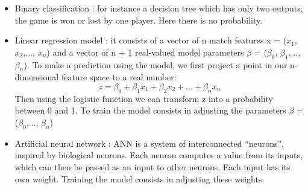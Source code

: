 \documentclass[12pt]{article}
\begin{document}
\begin{itemize}
    \item Binary classification : for instance a decision tree which has only two outputs, the game is won or lost by one player. Here there is no probability.
    \item Linear regression model : it consists of a vector of n match features x = ($x_1$, $x_2$,..., $x_n$) and a vector of n + 1 real-valued model parameters $\beta$ = ($\beta_0$, $\beta_1$,..., $\beta_n$). To make a prediction using the model, we first project a point in our n-dimensional feature space to a real number:
    \begin{equation*}
        z = \beta_0 + \beta_1 x_1 + \beta_2 x_2 + ... + \beta_n x_n
    \end{equation*}
    Then using the logistic function we can transform z into a probability between 0 and 1. To train the model consists in adjusting the parameters $\beta$ = ($\beta_0$,..., $\beta_n$)
    \item Artificial neural network : ANN is a system of interconnected “neurons”, inspired by biological neurons. Each neuron computes a value from its inputs, which can then be passed as an input to other neurons. Each input has its own weight. Training the model consists in adjusting these weights.
\end{itemize}
\end{document}
